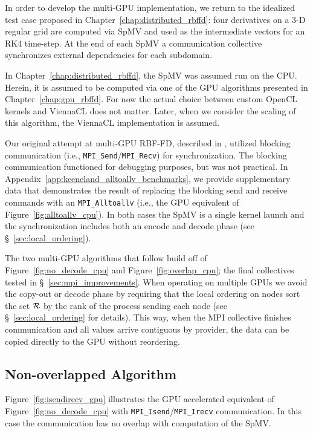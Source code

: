 In order to develop the multi-GPU implementation, we return to the idealized test case proposed in Chapter~\ref{chap:distributed_rbffd}: four derivatives on a 3-D regular grid are computed via SpMV and used as the intermediate vectors for an RK4 time-step. At the end of each SpMV a communication collective synchronizes external dependencies for each subdomain.

In Chapter~\ref{chap:distributed_rbffd}, the SpMV was assumed run on the CPU. Herein, it is assumed to be computed via one of the GPU algorithms presented in Chapter~\ref{chap:gpu_rbffd}. For now the actual choice between custom OpenCL kernels and ViennaCL does not matter. Later, when we consider the scaling of this algorithm, the ViennaCL implementation is assumed. 

Our original attempt at multi-GPU RBF-FD, described in \cite{BolligFlyerErlebacher2012}, utilized blocking communication (i.e., \texttt{MPI\_Send}/\texttt{MPI\_Recv}) for synchronization. The blocking communication functioned for debugging purposes, but was not practical. In Appendix~\ref{app:keeneland_alltoallv_benchmarks}, we provide supplementary data that demonstrates the result of replacing the blocking send and receive commands with an \texttt{MPI\_Alltoallv} (i.e., the GPU equivalent of Figure~\ref{fig:alltoallv_cpu}). In both cases the SpMV is a single kernel launch and the synchronization includes both an encode and decode phase (see \S~\ref{sec:local_ordering}). 

The two multi-GPU algorithms that follow build off of Figure~\ref{fig:no_decode_cpu} and Figure~\ref{fig:overlap_cpu}; the final collectives tested in \S~\ref{sec:mpi_improvements}. 
When operating on multiple GPUs we avoid the copy-out or decode phase by requiring that the local ordering on nodes sort the set $\mathcal{R}$ by the rank of the process sending each node (see \S~\ref{sec:local_ordering} for details). This way, when the MPI collective finishes communication and all values arrive contiguous by provider, the data can be copied directly to the GPU without reordering.

\subsection{Non-overlapped Algorithm}

Figure~\ref{fig:isendirecv_gpu} illustrates the GPU accelerated equivalent of Figure~\ref{fig:no_decode_cpu} with \texttt{MPI\_Isend}/\texttt{MPI\_Irecv} communication. In this case the communication has no overlap with computation of the SpMV. 

